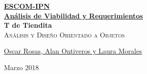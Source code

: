 \documentclass[12pt, fleqn]{report}                             %
\author{Oscar Rosas, Alan Ontiveros y Laura Morales}            %
\theoremstyle{break}                                            %
\begin{document}
\begin{titlepage}
    
    \pagecolor{TitlePageColor}                                      %
    \color{white}                                                   %

    \vspace                                                         %
    \baselineskip                                                   %

    \makebox[0pt][l]{\rule{1.3\textwidth}{3pt}}                     %
    
    \href{https://compilandoconocimiento.com}                       %
    {\textbf{\textsc{\Huge ESCOM-IPN}}}\\[2.7cm]                    %

    \href{\ProjectNameLink/LibroProbabilidad}                       %
    {\fontsize{36}{50}                                              %
        \selectfont \textbf{Análisis de Viabilidad y Requerimientos}}\\[0.5cm]       %
    {\fontsize{36}{50}                                              %
        \selectfont \textbf{T de Tiendita}}\\[0.5cm]                %
    \textcolor{ColorSubtext}                                        %
        {\textsc{\LARGE Análisis y Diseño Orientado a Objetos}}     %
    
    \vfill                                                          %
    
    \href{https://compilandoconocimiento.com/yo}                    %
    {\LARGE \textsf{Oscar Rosas, Alan Ontiveros y Laura Morales}}   %

    \vspace                                                         %
    \baselineskip                                                   %
    
    {\large \textsf{Marzo 2018}}                                  %

\end{titlepage}
\end{document}
